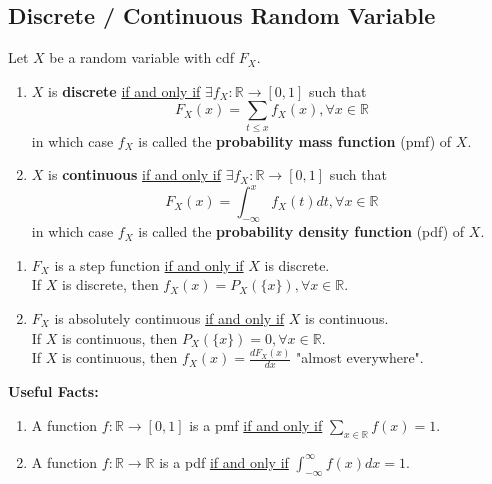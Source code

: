\documentclass[11pt]{elegantbook}
\begin{document}
\subsection{Discrete / Continuous Random Variable}
\begin{definition}
    \normalfont
    Let $X$ be a random variable with cdf $F_X$.
    \begin{enumerate}[$\circ$]
        \item $X$ is \textbf{discrete} \underline{if and only if} $\exists f_X: \mathbb{R} \rightarrow [0,1]$ such that $$F_X(x)=\sum_{t\leq x}f_X(x), \forall x\in \mathbb{R}$$
        in which case $f_X$ is called the \textbf{probability mass function} (pmf) of $X$.
        \item $X$ is \textbf{continuous} \underline{if and only if} $\exists f_X: \mathbb{R} \rightarrow [0,1]$ such that $$F_X(x)=\int_{-\infty}^x f_X(t)dt, \forall x\in \mathbb{R}$$
        in which case $f_X$ is called the \textbf{probability density function} (pdf) of $X$.
    \end{enumerate}
\end{definition}
\begin{proposition}
    \begin{enumerate}[$\circ$]
        \item $F_X$ is a step function \underline{if and only if} $X$ is discrete.\\
        If $X$ is discrete, then $f_X(x)=P_X(\{x\}), \forall x\in \mathbb{R}$.
        \item $F_X$ is absolutely continuous \underline{if and only if} $X$ is continuous.\\
        If $X$ is continuous, then $P_X(\{x\})=0, \forall x\in \mathbb{R}$.\\
        If $X$ is continuous, then $f_X(x)=\frac{d F_X(x)}{d x}$ "almost everywhere".
    \end{enumerate}
\end{proposition}

\begin{note}
    \textbf{Useful Facts:}
    \begin{enumerate}
        \item A function $f: \mathbb{R} \rightarrow [0,1]$ is a pmf \underline{if and only if} $\sum_{x\in \mathbb{R}}f(x)=1$.
        \item A function $f: \mathbb{R} \rightarrow \mathbb{R}$ is a pdf \underline{if and only if} $\int_{-\infty}^\infty f(x) dx=1$.
    \end{enumerate}
\end{note}
\end{document}
